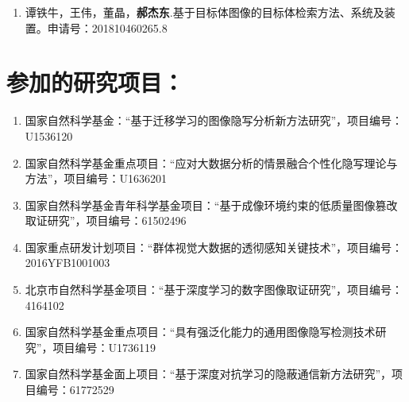 \begin{enumerate}
	\item 谭铁牛，王伟，董晶，\textbf{郝杰东}.基于目标体图像的目标体检索方法、系统及装置。申请号：201810460265.8
\end{enumerate}

\section*{参加的研究项目：}

\begin{enumerate}
	\item 国家自然科学基金：“基于迁移学习的图像隐写分析新方法研究”，项目编号：U1536120

	\item 国家自然科学基金重点项目：“应对大数据分析的情景融合个性化隐写理论与方法”，项目编号：U1636201

	\item 国家自然科学基金青年科学基金项目：“基于成像环境约束的低质量图像篡改取证研究”，项目编号：61502496

	\item 国家重点研发计划项目：“群体视觉大数据的透彻感知关键技术”，项目编号：2016YFB1001003

	\item 北京市自然科学基金项目：“基于深度学习的数字图像取证研究”，项目编号：4164102

	\item 国家自然科学基金重点项目：“具有强泛化能力的通用图像隐写检测技术研究”，项目编号：U1736119

	\item 国家自然科学基金面上项目：“基于深度对抗学习的隐蔽通信新方法研究”，项目编号：61772529

\end{enumerate}

